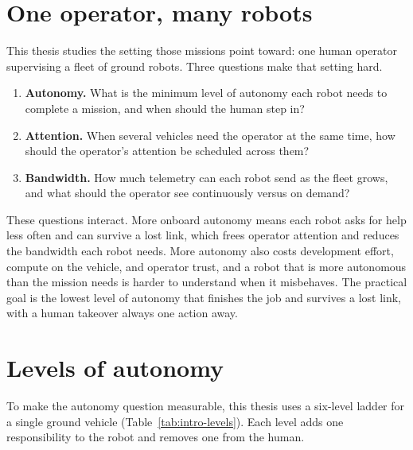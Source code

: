 \section*{One operator, many robots}

This thesis studies the setting those missions point toward: one human operator supervising a fleet of ground robots.
Three questions make that setting hard.

\begin{enumerate}
\item \textbf{Autonomy.} What is the minimum level of autonomy each robot needs to complete a mission, and when should the human step in?
\item \textbf{Attention.} When several vehicles need the operator at the same time, how should the operator's attention be scheduled across them?
\item \textbf{Bandwidth.} How much telemetry can each robot send as the fleet grows, and what should the operator see continuously versus on demand?
\end{enumerate}

These questions interact.
More onboard autonomy means each robot asks for help less often and can survive a lost link, which frees operator attention and reduces the bandwidth each robot needs.
More autonomy also costs development effort, compute on the vehicle, and operator trust, and a robot that is more autonomous than the mission needs is harder to understand when it misbehaves.
The practical goal is the lowest level of autonomy that finishes the job and survives a lost link, with a human takeover always one action away.

\section*{Levels of autonomy}

To make the autonomy question measurable, this thesis uses a six-level ladder for a single ground vehicle (Table~\ref{tab:intro-levels}).
Each level adds one responsibility to the robot and removes one from the human.

